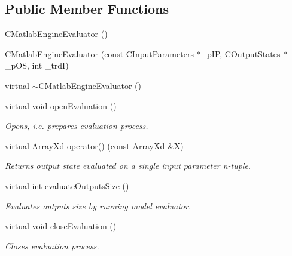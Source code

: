 \subsection*{Public Member Functions}
\begin{DoxyCompactItemize}
\item 
\hyperlink{class_go_s_u_m_1_1_c_matlab_engine_evaluator_a02ed581900a8c193fa413517e992cce2}{C\-Matlab\-Engine\-Evaluator} ()
\item 
\hyperlink{class_go_s_u_m_1_1_c_matlab_engine_evaluator_af40c36abb8201ffd38ecb9379c04ff36}{C\-Matlab\-Engine\-Evaluator} (const \hyperlink{class_go_s_u_m_1_1_c_input_parameters}{C\-Input\-Parameters} $\ast$\-\_\-p\-I\-P, \hyperlink{class_go_s_u_m_1_1_c_output_states}{C\-Output\-States} $\ast$\-\_\-p\-O\-S, int \-\_\-trd\-I)
\item 
virtual \hyperlink{class_go_s_u_m_1_1_c_matlab_engine_evaluator_a31a086ffbc31094487bed97bbae53bd3}{$\sim$\-C\-Matlab\-Engine\-Evaluator} ()
\item 
virtual void \hyperlink{class_go_s_u_m_1_1_c_matlab_engine_evaluator_a878e5b84a93c808806cad12019372722}{open\-Evaluation} ()
\begin{DoxyCompactList}\small\item\em Opens, i.\-e. prepares evaluation process. \end{DoxyCompactList}\item 
virtual Array\-Xd \hyperlink{class_go_s_u_m_1_1_c_matlab_engine_evaluator_a68cf94eec612bdd72fd032f5631aad66}{operator()} (const Array\-Xd \&X)
\begin{DoxyCompactList}\small\item\em Returns output state evaluated on a single input parameter n-\/tuple. \end{DoxyCompactList}\item 
virtual int \hyperlink{class_go_s_u_m_1_1_c_matlab_engine_evaluator_a646d7c6412cf8256a65271af5b1aad89}{evaluate\-Outputs\-Size} ()
\begin{DoxyCompactList}\small\item\em Evaluates outputs size by running model evaluator. \end{DoxyCompactList}\item 
virtual void \hyperlink{class_go_s_u_m_1_1_c_matlab_engine_evaluator_a238f3a03165e37f5707611ae1e1a53ae}{close\-Evaluation} ()
\begin{DoxyCompactList}\small\item\em Closes evaluation process. \end{DoxyCompactList}\end{DoxyCompactItemize}
